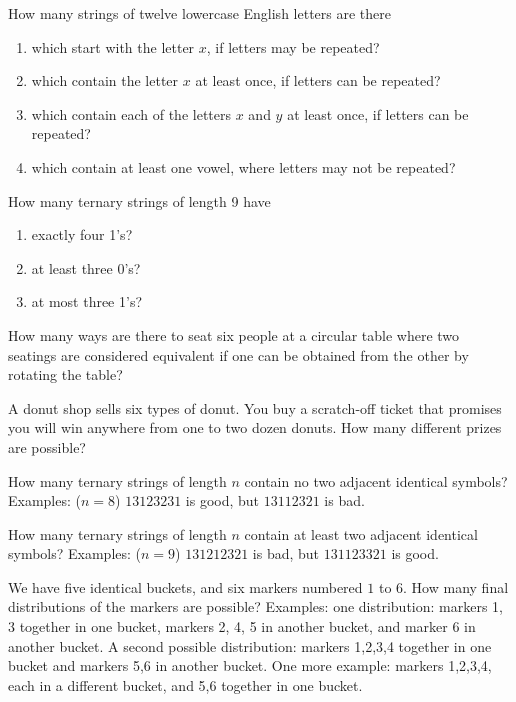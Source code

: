 \begin{prob}
\begin{fullwidth}
How many strings of twelve lowercase English letters are there
\end{fullwidth}
\begin{enumerate}[label=(\alph*)]
 \item which start with the letter $x$, if letters may be repeated?
 \item which contain the letter $x$ at least once, if letters can be repeated?
 \item which contain each of the letters $x$ and $y$ at least once, if letters can be repeated?
 \item which contain at least one vowel, where letters may not be repeated?
\end{enumerate}

\end{prob}

\begin{prob}
How many ternary strings of length 9 have
\begin{enumerate}[label=(\alph*)]
 \item exactly four 1's?
 \item at least three 0's?
 \item at most three 1's?
\end{enumerate}
\end{prob}


\begin{prob}
How many ways are there to seat six people at a circular table where two seatings are considered equivalent if one
can be obtained from the other by rotating the table?
\end{prob}

\begin{prob}
A donut shop sells six types of donut. You buy a scratch{-}off ticket that promises you will win anywhere from one to two dozen donuts. How many different prizes are possible?
\end{prob}

\begin{prob}
How many ternary strings of length $n$ contain no two adjacent identical symbols? Examples: ($n = 8$)
$13123231$ is good, but $13112321$ is bad.
\end{prob}

\begin{prob}
How many ternary strings of length $n$ contain at least two adjacent identical symbols? Examples: ($n=9$)
$131212321$ is bad, but $131123321$ is good.
\end{prob}

\begin{prob}
We have five identical buckets, and six markers numbered $1$ to $6$. How many final distributions of the markers are possible? Examples: one distribution: markers 1, 3 together in one bucket, markers 2, 4,
5 in another bucket, and marker 6 in another bucket. A second possible distribution: markers 1,2,3,4 together in one bucket and markers 5,6 in another bucket. One more example: markers 1,2,3,4, each in a different bucket,
and 5,6 together in one bucket.
\end{prob}

